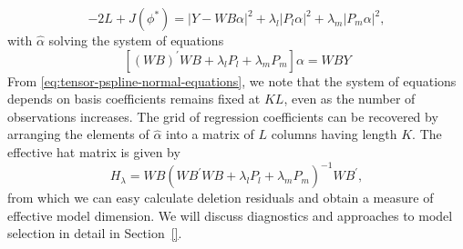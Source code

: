 \documentclass[12pt]{article}
\newcommand{\ms}{\scriptscriptstyle}
\theoremstyle{definition}
\begin{document}
\begin{equation} \label{eq:tensor-pspline-objective-function}
-2L + J\left(\phi^*\right) = \vert Y - WB\alpha \vert^2 + \lambda_l \vert P_l \alpha \vert^2 + \lambda_m \vert P_m \alpha \vert^2,
\end{equation}
\noindent
with $\hat{\alpha}$ solving the system of equations 
\begin{equation} \label{eq:tensor-pspline-normal-equations}
\left[ \left(WB\right)^\prime WB +  \lambda_l P_l+ \lambda_m P_m\right]\alpha = W B Y
\end{equation}
\noindent
From \ref{eq:tensor-pspline-normal-equations}, we note that the system of equations depends on basis coefficients remains fixed at $KL$, even as the number of observations increases.   The grid of regression coefficients can be recovered by arranging the elements of $\hat{\alpha}$ into a matrix of $L$ columns having length $K$. The effective hat matrix is given by 
\[
H_\lambda = W B\left(W B^\prime W B +  \lambda_l P_l + \lambda_m P_m \right)^{-1} W B^\prime,
\]
from which we can easy calculate deletion residuals and obtain a measure of effective model dimension. We will discuss diagnostics and approaches to model selection in detail in Section~\ref{}.




% 
%
%
%
% 
\end{document}
